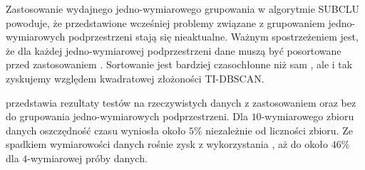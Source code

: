 



Zastosowanie wydajnego jedno-wymiarowego grupowania w algorytmie SUBCLU powoduje, że przedstawione wcześniej problemy związane z grupowaniem jedno-wymiarowych podprzestrzeni stają się nieaktualne. Ważnym spostrzeżeniem jest, że dla każdej jedno-wymiarowej podprzestrzeni dane muszą być posortowane przed zastosowaniem . Sortowanie jest bardziej czasochłonne niż sam , ale i tak zyskujemy względem kwadratowej złożoności \mbox{TI-DBSCAN}.\par
{} przedstawia rezultaty testów na rzeczywistych danych z zastosowaniem oraz bez  do grupowania jedno-wymiarowych podprzestrzeni. Dla $ 10 $-wymiarowego zbioru danych oszczędność czasu wyniosła około $ 5\% $ niezależnie od liczności zbioru. Ze spadkiem wymiarowości danych rośnie zysk z wykorzystania , aż do około $ 46\% $ dla $ 4 $-wymiarowej próby danych.
